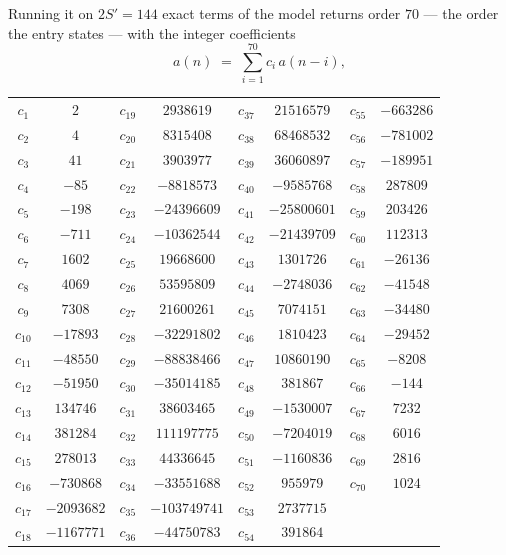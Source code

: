 \documentclass[11pt,a4paper]{article}
\theoremstyle{plain}
\theoremstyle{definition}
\begin{document}
Running it on $2S'=144$ exact terms of the model returns order $70$ --- the order the
entry states --- with the integer coefficients
\[
a(n)\;=\;\sum_{i=1}^{70}c_i\,a(n-i),
\]
\begin{center}\small
\begin{tabular}{cccccccc}
$c_{1}$ & $2$ & $c_{19}$ & $2938619$ & $c_{37}$ & $21516579$ & $c_{55}$ & $-663286$ \\
$c_{2}$ & $4$ & $c_{20}$ & $8315408$ & $c_{38}$ & $68468532$ & $c_{56}$ & $-781002$ \\
$c_{3}$ & $41$ & $c_{21}$ & $3903977$ & $c_{39}$ & $36060897$ & $c_{57}$ & $-189951$ \\
$c_{4}$ & $-85$ & $c_{22}$ & $-8818573$ & $c_{40}$ & $-9585768$ & $c_{58}$ & $287809$ \\
$c_{5}$ & $-198$ & $c_{23}$ & $-24396609$ & $c_{41}$ & $-25800601$ & $c_{59}$ & $203426$ \\
$c_{6}$ & $-711$ & $c_{24}$ & $-10362544$ & $c_{42}$ & $-21439709$ & $c_{60}$ & $112313$ \\
$c_{7}$ & $1602$ & $c_{25}$ & $19668600$ & $c_{43}$ & $1301726$ & $c_{61}$ & $-26136$ \\
$c_{8}$ & $4069$ & $c_{26}$ & $53595809$ & $c_{44}$ & $-2748036$ & $c_{62}$ & $-41548$ \\
$c_{9}$ & $7308$ & $c_{27}$ & $21600261$ & $c_{45}$ & $7074151$ & $c_{63}$ & $-34480$ \\
$c_{10}$ & $-17893$ & $c_{28}$ & $-32291802$ & $c_{46}$ & $1810423$ & $c_{64}$ & $-29452$ \\
$c_{11}$ & $-48550$ & $c_{29}$ & $-88838466$ & $c_{47}$ & $10860190$ & $c_{65}$ & $-8208$ \\
$c_{12}$ & $-51950$ & $c_{30}$ & $-35014185$ & $c_{48}$ & $381867$ & $c_{66}$ & $-144$ \\
$c_{13}$ & $134746$ & $c_{31}$ & $38603465$ & $c_{49}$ & $-1530007$ & $c_{67}$ & $7232$ \\
$c_{14}$ & $381284$ & $c_{32}$ & $111197775$ & $c_{50}$ & $-7204019$ & $c_{68}$ & $6016$ \\
$c_{15}$ & $278013$ & $c_{33}$ & $44336645$ & $c_{51}$ & $-1160836$ & $c_{69}$ & $2816$ \\
$c_{16}$ & $-730868$ & $c_{34}$ & $-33551688$ & $c_{52}$ & $955979$ & $c_{70}$ & $1024$ \\
$c_{17}$ & $-2093682$ & $c_{35}$ & $-103749741$ & $c_{53}$ & $2737715$ &  &  \\
$c_{18}$ & $-1167771$ & $c_{36}$ & $-44750783$ & $c_{54}$ & $391864$ &  &  \\
\end{tabular}
\end{center}
\end{document}
